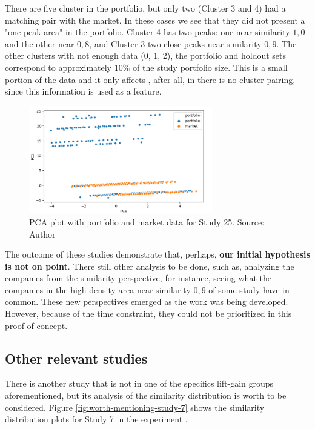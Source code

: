 There are five cluster in the portfolio, but only two (Cluster 3 and 4) had a matching pair with the market. In these cases we see that they did not present a "one peak area" in the portfolio. Cluster 4 has two peaks: one near similarity $1,0$ and the other near $0,8$, and Cluster 3 two close peaks near similarity $0,9$. The other clusters with not enough data (0, 1, 2), the portfolio and holdout sets correspond to approximately $10\%$ of the study portfolio size. This is a small portion of the data and it only affects \nameExperimentI{}, after all, in \nameExperimentII{} there is no cluster pairing, since this information is used as a feature.

\begin{figure}[!ht]
   \centering
   \includegraphics[width=8cm]{fig/ch4-study-25-pca.png}
   \caption{PCA plot with portfolio and market data for Study 25. Source: Author}
   \label{fig:study-25-pca}
\end{figure}

The outcome of these studies demonstrate that, perhaps, \textbf{our initial hypothesis is not on point}. There still other analysis to be done, such as, analyzing the companies from the similarity perspective, for instance, seeing what the companies in the high density area near similarity $0,9$ of some study have in common. These new perspectives emerged as the work was being developed. However, because of the time constraint, they could not be prioritized in this proof of concept. 

\subsection{Other relevant studies}
\label{ch:worth-ment}

There is another study that is not in one of the specifics lift-gain groups aforementioned, but its analysis of the similarity distribution is worth to be considered. Figure \ref{fig:worth-mentioning-study-7} shows the similarity distribution plots for Study 7 in the experiment \nameExperimentII{}. 

